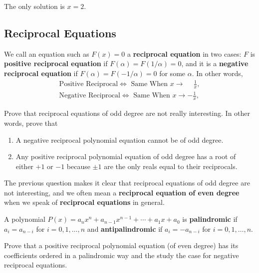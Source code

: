 \begin{solution}
    The only solution is $x=2$.
\end{solution}





\subsection{Reciprocal Equations}

\begin{tcolorbox}[title={Positive Reciprocal Equations}]
    \begin{definition}
        We call an equation such as $F(x)=0$ a \textbf{reciprocal equation} in two cases: $F$ is \textbf{positive reciprocal equation} if $F(\alpha)=F(1/\alpha)=0$, and it is a \textbf{negative reciprocal equation} if $F(\alpha)=F(-1/\alpha)=0$ for some $\alpha$. In other words,
        \begin{align*}
            \text{Positive Reciprocal} \iff \text{ Same When } x \to \phantom{-}\frac{1}{x},\\ \text{Negative Reciprocal} \iff \text{ Same When } x \to -\frac{1}{x},
        \end{align*}
    \end{definition}
    \begin{question}
        Prove that reciprocal equations of odd degree are not really interesting. In other words, prove that
        \begin{enumerate}
            \item A negative reciprocal polynomial equation cannot be of odd degree.
            \item Any positive reciprocal polynomial equation of odd degree has a root of either $+1$ or $-1$ because $\pm 1$ are the only reals equal to their reciprocals.
        \end{enumerate}
    \end{question}
    The previous question makes it clear that reciprocal equations of odd degree are not interesting, and we often mean a \textbf{reciprocal equation of even degree} when we speak of \textbf{reciprocal equations} in general.
    \begin{definition}
        A polynomial $P(x)=a_nx^n+a_{n-1}x^{n-1}+\cdots+a_1x+a_0$ is \textbf{palindromic} if $a_i = a_{n-i}$ for $i = 0, 1, \dots, n$ and \textbf{antipalindromic} if $a_i = -a_{n-i}$ for $i = 0, 1, \dots, n$.
    \end{definition}
    \begin{question}
        Prove that a positive reciprocal polynomial equation (of even degree) has its coefficients ordered in a palindromic way and the study the case for negative reciprocal equations.
    \end{question}
\end{tcolorbox}

